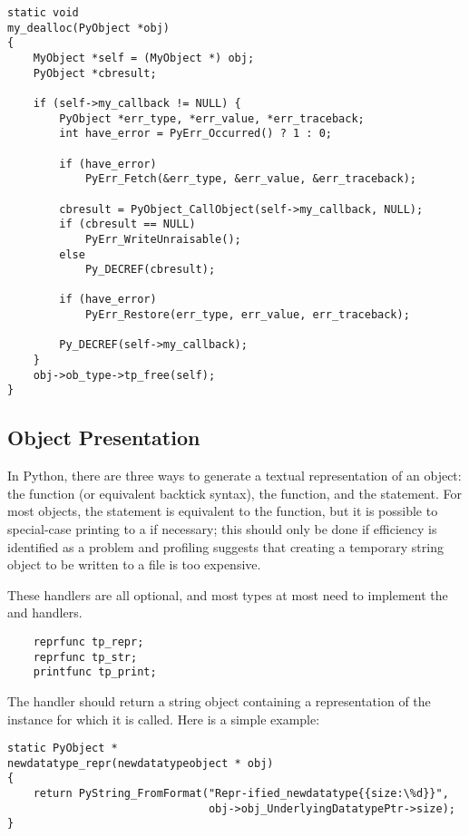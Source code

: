 \begin{verbatim}
static void
my_dealloc(PyObject *obj)
{
    MyObject *self = (MyObject *) obj;
    PyObject *cbresult;

    if (self->my_callback != NULL) {
        PyObject *err_type, *err_value, *err_traceback;
        int have_error = PyErr_Occurred() ? 1 : 0;

        if (have_error)
            PyErr_Fetch(&err_type, &err_value, &err_traceback);

        cbresult = PyObject_CallObject(self->my_callback, NULL);
        if (cbresult == NULL)
            PyErr_WriteUnraisable();
        else
            Py_DECREF(cbresult);

        if (have_error)
            PyErr_Restore(err_type, err_value, err_traceback);

        Py_DECREF(self->my_callback);
    }
    obj->ob_type->tp_free(self);
}
\end{verbatim}


\subsection{Object Presentation}

In Python, there are three ways to generate a textual representation
of an object: the  function (or
equivalent backtick syntax), the 
function, and the  statement.  For most objects, the
 statement is equivalent to the 
function, but it is possible to special-case printing to a
 if necessary; this should only be done if efficiency is
identified as a problem and profiling suggests that creating a
temporary string object to be written to a file is too expensive.

These handlers are all optional, and most types at most need to
implement the  and  handlers.

\begin{verbatim}
    reprfunc tp_repr;
    reprfunc tp_str;
    printfunc tp_print;
\end{verbatim}

The  handler should return a string object containing
a representation of the instance for which it is called.  Here is a
simple example:

\begin{verbatim}
static PyObject *
newdatatype_repr(newdatatypeobject * obj)
{
    return PyString_FromFormat("Repr-ified_newdatatype{{size:\%d}}",
                               obj->obj_UnderlyingDatatypePtr->size);
}
\end{verbatim}

